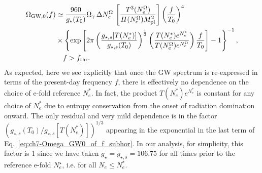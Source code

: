 \begin{align}
    \Omega_{\rm GW,0}(f)&\simeq \frac{960 }{g_{\star}(T_0)}\Omega_\gamma\,\Delta N_{e}^{\Omega}\,\left[\frac{T^3(N_e^{\Omega})}{ H(N_e^{\Omega}) M_{\rm pl}^2}\right] \left(\frac{f}{T_0}\right)^4 \nonumber \\
    &\times\left\{\exp\left[2\pi\left(\frac{g_{\star,s}[T(N^*_{e})]}{g_{\star,s}(T_0)}\right)^{\frac{1}{3}}\left( \frac{T(N_e^*)e^{N_e^*}}{T(N_e^\Omega)e^{N_e^\Omega}}\right)\frac{f}{T_0}\right]-1\right\}^{-1}, \nonumber \\
    &\quad f> f_{\rm thr}.\label{eq:ch7-Omega_GW0_of_f_subhor}
\end{align}
As expected, here we see explicitly that once the GW spectrum is re-expressed in terms of the present-day frequency $f$, there is effectively no dependence on the choice of e-fold reference $N_e^*$. In fact, the product $T(N_e^*)e^{N_e^*}$ is constant for any choice of $N_e^*$ due to entropy conservation from the onset of radiation domination onward. The only residual and very mild dependence is in the factor $(g_{\star,s}(T_0)/g_{\star,s}[T(N_e^*)])^{1/3}$ appearing in the exponential in the last term of Eq.~\eqref{eq:ch7-Omega_GW0_of_f_subhor}.
In our analysis, for simplicity,  this factor is 1 since we have taken $g_\star=g_{\star,s} = 106.75$ for all times prior to the reference e-fold $N_e^\star$, i.e. for all $N_e\leq N_e^*$.


